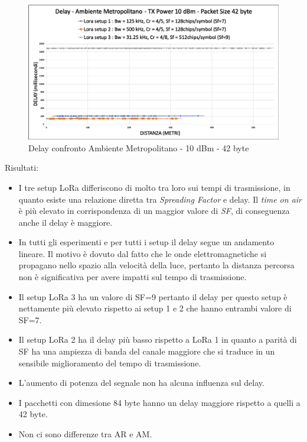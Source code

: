 \documentclass[12pt,a4paper,openright,twoside]{report}
\begin{document}
\begin{figure}[h]                      
\begin{center} 
\includegraphics[width=\textwidth]{DELAY_confronto_AM_10dBm_42byte.png}
\caption[Delay confronto Ambiente Metropolitano - 10 dBm - 42 byte]{Delay confronto Ambiente Metropolitano - 10 dBm - 42 byte}\label{fig:prima}
\end{center}
\end{figure}

Risultati:
\begin{itemize}    
\item I tre setup LoRa differiscono di molto tra loro sui tempi di trasmissione, in quanto esiste una relazione diretta tra \textit{Spreading Factor} e delay. 
Il \textit{time on air} \`e pi\`u elevato in corrispondenza di un maggior valore di \textit{SF}, di conseguenza anche il delay \`e maggiore. 
\item In tutti gli esperimenti e per tutti i setup il delay segue un andamento lineare. Il motivo \`e dovuto dal fatto che le onde elettromagnetiche si propagano nello spazio alla velocit\`a della luce, pertanto la distanza percorsa non \`e significativa per avere impatti sul tempo di trasmissione.
\item Il setup LoRa 3 ha un valore di SF=9 pertanto il delay per questo setup \`e nettamente pi\`u elevato rispetto ai setup 1 e 2 che hanno entrambi valore di SF=7.
\item Il setup LoRa 2 ha il delay pi\`u basso rispetto a LoRa 1 in quanto a parit\`a di SF ha una ampiezza di banda del canale maggiore che si traduce in un sensibile miglioramento del tempo di trasmissione.
\item L'aumento di potenza del segnale non ha alcuna influenza sul delay.
\item I pacchetti con dimesione 84 byte hanno un delay maggiore rispetto a quelli a 42 byte.
\item Non ci sono differenze tra AR e AM.
\end{itemize}
\end{document}
